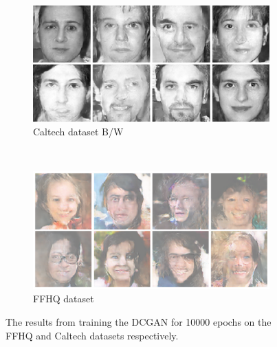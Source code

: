 \begin{figure}[h!]
    \centering
    \begin{subfigure}[b]{0.45\textwidth}
        \includegraphics[width=\textwidth]{fig/dcgan/caltech/epoch10000}
        \caption{Caltech dataset B/W}
        \label{dcgan-caltech}
    \end{subfigure}
    ~
    \begin{subfigure}[b]{0.45\textwidth}
        \includegraphics[width=\textwidth]{fig/dcgan/ffhq/epoch10000}
        \caption{FFHQ dataset}
        \label{dcgan-ffhq}
    \end{subfigure}
    \caption{The results from training the DCGAN for 10000 epochs on the FFHQ and Caltech datasets respectively.}
    \label{dcgan-results}
\end{figure}



